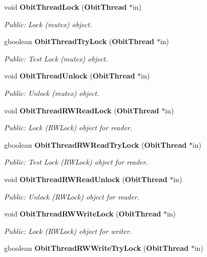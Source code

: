 \begin{CompactItemize}
void {\bf Obit\-Thread\-Lock} ({\bf Obit\-Thread} $\ast$in)
\begin{CompactList}\small\item\em Public: Lock (mutex) object. \item\end{CompactList}\item 
gboolean {\bf Obit\-Thread\-Try\-Lock} ({\bf Obit\-Thread} $\ast$in)
\begin{CompactList}\small\item\em Public: Test Lock (mutex) object. \item\end{CompactList}\item 
void {\bf Obit\-Thread\-Unlock} ({\bf Obit\-Thread} $\ast$in)
\begin{CompactList}\small\item\em Public: Unlock (mutex) object. \item\end{CompactList}\item 
void {\bf Obit\-Thread\-RWRead\-Lock} ({\bf Obit\-Thread} $\ast$in)
\begin{CompactList}\small\item\em Public: Lock (RWLock) object for reader. \item\end{CompactList}\item 
gboolean {\bf Obit\-Thread\-RWRead\-Try\-Lock} ({\bf Obit\-Thread} $\ast$in)
\begin{CompactList}\small\item\em Public: Test Lock (RWLock) object for reader. \item\end{CompactList}\item 
void {\bf Obit\-Thread\-RWRead\-Unlock} ({\bf Obit\-Thread} $\ast$in)
\begin{CompactList}\small\item\em Public: Unlock (RWLock) object for reader. \item\end{CompactList}\item 
void {\bf Obit\-Thread\-RWWrite\-Lock} ({\bf Obit\-Thread} $\ast$in)
\begin{CompactList}\small\item\em Public: Lock (RWLock) object for writer. \item\end{CompactList}\item 
gboolean {\bf Obit\-Thread\-RWWrite\-Try\-Lock} ({\bf Obit\-Thread} $\ast$in)

\end{CompactItemize}
